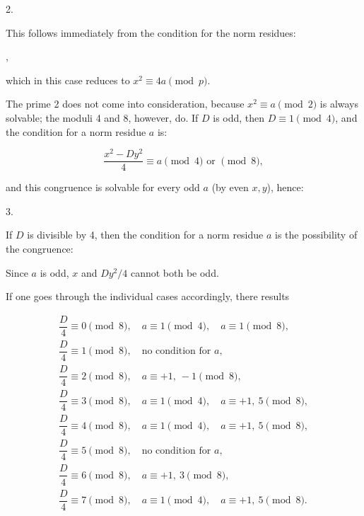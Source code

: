 2. 

This follows immediately from the condition for the norm residues:

,

which in this case reduces to $x^2 \equiv 4a \pmod{p}$.

The prime 2 does not come into consideration, because $x^2 \equiv a \pmod{2}$ is always solvable; the moduli 4 and 8, however, do. If $D$ is odd, then $D \equiv 1 \pmod{4}$, and the condition for a norm residue $a$ is:

\[ \frac{x^2 - D y^2}{4} \equiv a \pmod{4} \text{ or } \pmod{8}, \]

and this congruence is solvable for every odd $a$ (by even $x, y$), hence:

3. 

If $D$ is divisible by 4, then the condition for a norm residue $a$ is the possibility of the congruence:


Since $a$ is odd, $x$ and $D y^2/4$ cannot both be odd.

If one goes through the individual cases accordingly, there results

\[
\begin{array}{l}
\dfrac{D}{4} \equiv 0 \pmod{8}, \quad a \equiv 1 \pmod{4}, \quad a \equiv 1 \pmod{8},\\[6pt]
\dfrac{D}{4} \equiv 1 \pmod{8}, \quad \text{no condition for } a,\\[6pt]
\dfrac{D}{4} \equiv 2 \pmod{8}, \quad a \equiv +1,\ -1 \pmod{8},\\[6pt]
\dfrac{D}{4} \equiv 3 \pmod{8}, \quad a \equiv 1 \pmod{4}, \quad a \equiv +1,\ 5 \pmod{8},\\[6pt]
\dfrac{D}{4} \equiv 4 \pmod{8}, \quad a \equiv 1 \pmod{4}, \quad a \equiv +1,\ 5 \pmod{8},\\[6pt]
\dfrac{D}{4} \equiv 5 \pmod{8}, \quad \text{no condition for } a,\\[6pt]
\dfrac{D}{4} \equiv 6 \pmod{8}, \quad a \equiv +1,\ 3 \pmod{8},\\[6pt]
\dfrac{D}{4} \equiv 7 \pmod{8}, \quad a \equiv 1 \pmod{4}, \quad a \equiv +1,\ 5 \pmod{8}.
\end{array}
\]
